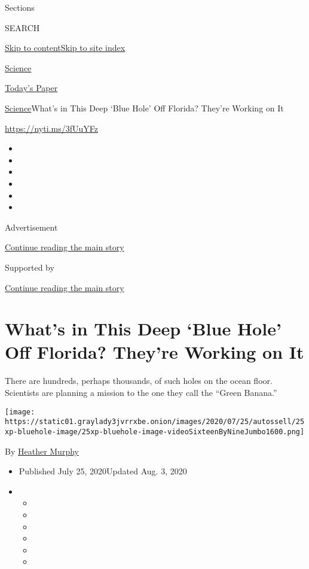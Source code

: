 Sections

SEARCH

\protect\hyperlink{site-content}{Skip to
content}\protect\hyperlink{site-index}{Skip to site index}

\href{https://www.nytimes3xbfgragh.onion/section/science}{Science}

\href{https://myaccount.nytimes3xbfgragh.onion/auth/login?response_type=cookie\&client_id=vi}{}

\href{https://www.nytimes3xbfgragh.onion/section/todayspaper}{Today's
Paper}

\href{/section/science}{Science}\textbar{}What's in This Deep `Blue
Hole' Off Florida? They're Working on It

\url{https://nyti.ms/3fUuYFz}

\begin{itemize}
\item
\item
\item
\item
\item
\item
\end{itemize}

Advertisement

\protect\hyperlink{after-top}{Continue reading the main story}

Supported by

\protect\hyperlink{after-sponsor}{Continue reading the main story}

\hypertarget{whats-in-this-deep-blue-hole-off-florida-theyre-working-on-it}{%
\section{What's in This Deep `Blue Hole' Off Florida? They're Working on
It}\label{whats-in-this-deep-blue-hole-off-florida-theyre-working-on-it}}

There are hundreds, perhaps thousands, of such holes on the ocean floor.
Scientists are planning a mission to the one they call the ``Green
Banana.''

\texttt{[image: https://static01.graylady3jvrrxbe.onion/images/2020/07/25/autossell/25xp-bluehole-image/25xp-bluehole-image-videoSixteenByNineJumbo1600.png]}

By \href{https://www.nytimes3xbfgragh.onion/by/heather-murphy}{Heather
Murphy}

\begin{itemize}
\item
  Published July 25, 2020Updated Aug. 3, 2020
\item
  \begin{itemize}
  \item
  \item
  \item
  \item
  \item
  \item
  \end{itemize}
\end{itemize}

